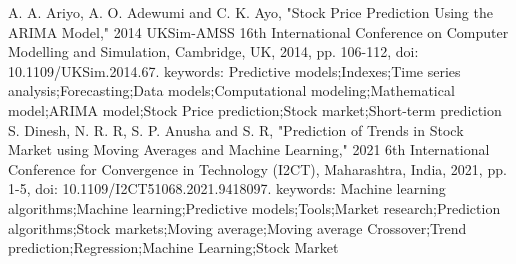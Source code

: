 \documentclass[conference]{IEEEtran}
\begin{document}
\begin{thebibliography}{00}
 A. A. Ariyo, A. O. Adewumi and C. K. Ayo, "Stock Price Prediction Using the ARIMA Model," 2014 UKSim-AMSS 16th International Conference on Computer Modelling and Simulation, Cambridge, UK, 2014, pp. 106-112, doi: 10.1109/UKSim.2014.67. keywords: {Predictive models;Indexes;Time series analysis;Forecasting;Data models;Computational modeling;Mathematical model;ARIMA model;Stock Price prediction;Stock market;Short-term prediction}
 S. Dinesh, N. R. R, S. P. Anusha and S. R, "Prediction of Trends in Stock Market using Moving Averages and Machine Learning," 2021 6th International Conference for Convergence in Technology (I2CT), Maharashtra, India, 2021, pp. 1-5, doi: 10.1109/I2CT51068.2021.9418097. keywords: {Machine learning algorithms;Machine learning;Predictive models;Tools;Market research;Prediction algorithms;Stock markets;Moving average;Moving average Crossover;Trend prediction;Regression;Machine Learning;Stock Market}





\end{thebibliography}
\end{document}
